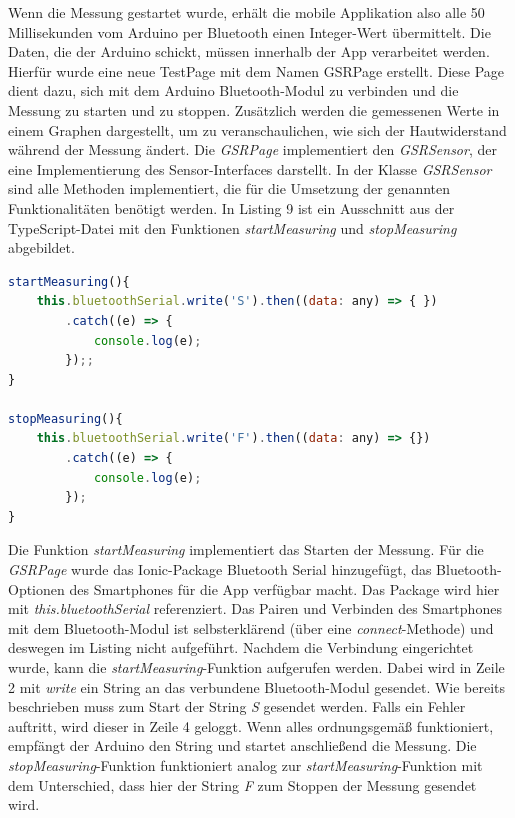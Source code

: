 Wenn die Messung gestartet wurde, erhält die mobile Applikation also alle 50 Millisekunden vom Arduino per Bluetooth einen Integer-Wert übermittelt. \newline
Die Daten, die der Arduino schickt, müssen innerhalb der App verarbeitet werden. Hierfür wurde eine neue TestPage mit dem Namen GSRPage erstellt. Diese Page dient dazu, sich mit dem Arduino Bluetooth-Modul zu verbinden und die Messung zu starten und zu stoppen. Zusätzlich werden die gemessenen Werte in einem Graphen dargestellt, um zu veranschaulichen, wie sich der Hautwiderstand während der Messung ändert. \newline \newline
Die \textit{GSRPage} implementiert den \textit{GSRSensor}, der eine Implementierung des Sensor-Interfaces darstellt. In der Klasse \textit{GSRSensor} sind alle Methoden implementiert, die für die Umsetzung der genannten Funktionalitäten benötigt werden. In Listing 9 ist ein Ausschnitt aus der TypeScript-Datei mit den Funktionen \textit{startMeasuring} und \textit{stopMeasuring} abgebildet. \newline
\begin{lstlisting}[caption={startMeasuring- und stopMeasuring-Funktion}, language=JavaScript]
startMeasuring(){
	this.bluetoothSerial.write('S').then((data: any) => { })
		.catch((e) => {
			console.log(e);
		});;
}

stopMeasuring(){
	this.bluetoothSerial.write('F').then((data: any) => {})
		.catch((e) => {
			console.log(e);
		});
}
\end{lstlisting}
Die Funktion \textit{startMeasuring} implementiert das Starten der Messung. Für die \textit{GSRPage} wurde das Ionic-Package Bluetooth Serial hinzugefügt, das Bluetooth-Optionen des Smartphones für die App verfügbar macht. Das Package wird hier mit \textit{this.bluetoothSerial} referenziert. Das Pairen und Verbinden des Smartphones mit dem Bluetooth-Modul ist selbsterklärend (über eine \textit{connect}-Methode) und deswegen im Listing nicht aufgeführt. Nachdem die Verbindung eingerichtet wurde, kann die \textit{startMeasuring}-Funktion aufgerufen werden. Dabei wird in Zeile 2 mit \textit{write} ein String an das verbundene Bluetooth-Modul gesendet. Wie bereits beschrieben muss zum Start der String \textit{S} gesendet werden. Falls ein Fehler auftritt, wird dieser in Zeile 4 geloggt. Wenn alles ordnungsgemäß funktioniert, empfängt der Arduino den String und startet anschließend die Messung.\newline
Die \textit{stopMeasuring}-Funktion funktioniert analog zur \textit{startMeasuring}-Funktion mit dem Unterschied, dass hier der String \textit{F} zum Stoppen der Messung gesendet wird.
